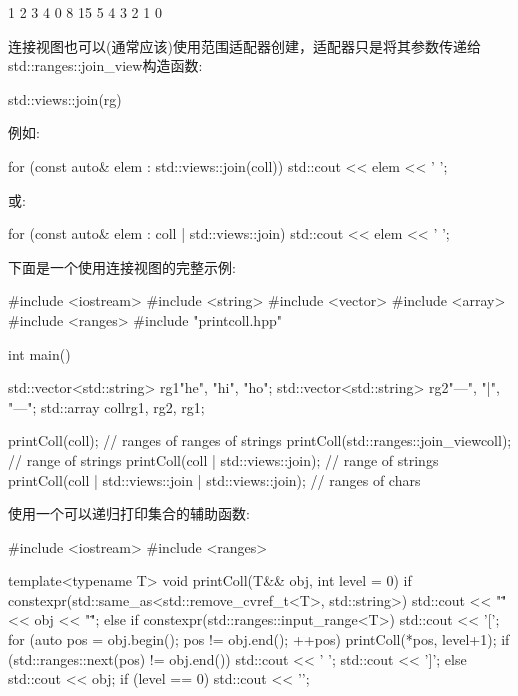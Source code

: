 \begin{shell}
1 2 3 4 0 8 15 5 4 3 2 1 0
\end{shell}


连接视图也可以(通常应该)使用范围适配器创建，适配器只是将其参数传递给std::ranges::join\_view构造函数:

\begin{cpp}
std::views::join(rg)
\end{cpp}

例如:

\begin{cpp}
for (const auto& elem : std::views::join(coll)) {
	std::cout << elem << ' ';
}
\end{cpp}

或:

\begin{cpp}
for (const auto& elem : coll | std::views::join) {
	std::cout << elem << ' ';
}
\end{cpp}

下面是一个使用连接视图的完整示例:


\begin{cpp}
#include <iostream>
#include <string>
#include <vector>
#include <array>
#include <ranges>
#include "printcoll.hpp"

int main()
{
	std::vector<std::string> rg1{"he", "hi", "ho"};
	std::vector<std::string> rg2{"---", "|", "---"};
	std::array coll{rg1, rg2, rg1};
	
	printColl(coll); // ranges of ranges of strings
	printColl(std::ranges::join_view{coll}); // range of strings
	printColl(coll | std::views::join); // range of strings
	printColl(coll | std::views::join | std::views::join); // ranges of chars
}
\end{cpp}

使用一个可以递归打印集合的辅助函数:


\begin{cpp}
#include <iostream>
#include <ranges>

template<typename T>
void printColl(T&& obj, int level = 0)
{
	if constexpr(std::same_as<std::remove_cvref_t<T>, std::string>) {
		std::cout << "\"" << obj << "\"";
	}
	else if constexpr(std::ranges::input_range<T>) {
		std::cout << '[';
		for (auto pos = obj.begin(); pos != obj.end(); ++pos) {
			printColl(*pos, level+1);
			if (std::ranges::next(pos) != obj.end()) {
				std::cout << ' ';
			}
		}
		std::cout << ']';
	}
	else {
		std::cout << obj;
	}
	if (level == 0) std::cout << '\n';
}
\end{cpp}

